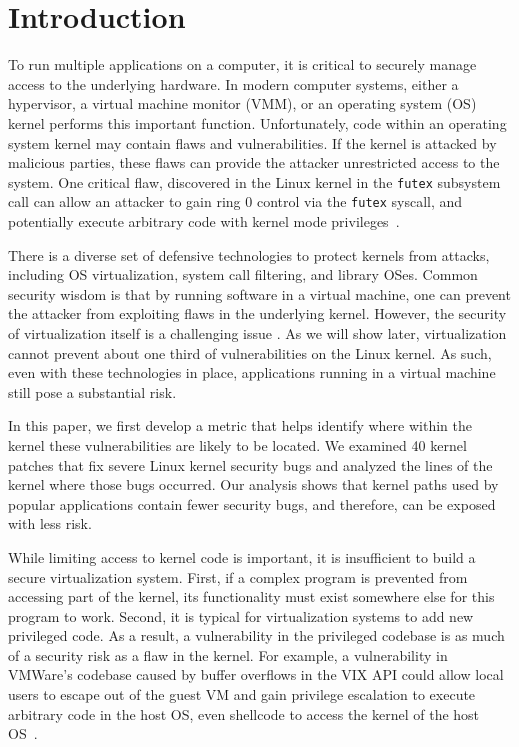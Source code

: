\section{Introduction}
\label{sec.introduction}

To run multiple applications on a computer, it is critical to securely
manage access to the underlying hardware. In modern computer systems,
either a hypervisor, a virtual machine monitor (VMM), or an 
operating system (OS) kernel performs this important function. Unfortunately, code within an operating system kernel
may contain flaws and vulnerabilities. If the kernel is attacked by malicious parties, these flaws can provide the attacker unrestricted access to the system. One critical flaw, discovered in the Linux kernel in the \texttt{futex} subsystem call can allow an attacker to gain ring 0 control via the \texttt{futex} syscall, and potentially execute arbitrary code
with kernel mode privileges~\cite{CVE-2014-3153}. 

There is a diverse set of defensive technologies to protect kernels from 
attacks, including OS virtualization, system call filtering, and library OSes.
Common security wisdom is that by running software in a virtual machine, 
one can prevent the attacker from exploiting flaws in the underlying kernel.  However, the security of virtualization itself is a 
challenging issue \cite{Tal}. As we will show later, virtualization cannot prevent about one third of vulnerabilities on the Linux kernel. As such, even with these technologies in place, applications running in a virtual machine still pose a substantial risk.

In this paper, we first develop a metric that helps identify where
within the kernel these vulnerabilities are likely to be located. We
examined 40 kernel patches that fix severe Linux kernel security bugs
and analyzed the lines of the kernel where those bugs occurred.  Our
analysis shows that kernel paths used by popular applications contain fewer
security bugs, and therefore, can be exposed with less risk. 

While limiting access to kernel code is important, it is
insufficient to build a secure virtualization system.  First, if a complex
program is prevented from accessing part of the kernel, its functionality 
must exist somewhere else for this program to work.  Second, it is 
typical for virtualization systems to add new privileged code.
As a result, a vulnerability in the privileged codebase is as much of a security 
risk as a flaw in the kernel.  %
For example, 
a vulnerability in VMWare's codebase caused by buffer overflows in the VIX
API could allow local users to escape out of the guest VM and 
gain privilege escalation to execute arbitrary code in the host
OS, even shellcode to access the kernel of the host OS~\cite{CVE-2008-2100}.  

